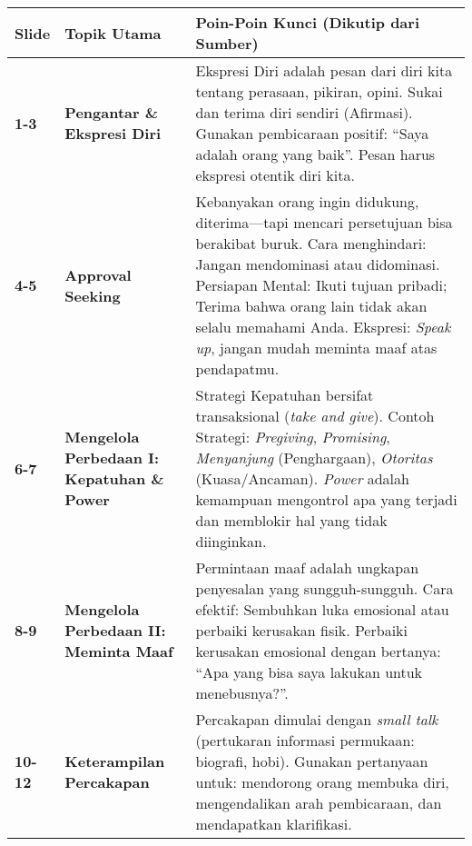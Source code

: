 \documentclass[
  letterpaper,
  DIV=11,
  numbers=noendperiod]{scrreprt}
\begin{document}
\begin{longtable}[]{@{}
  >{\raggedright\arraybackslash}p{}
  >{\raggedright\arraybackslash}p{}
  >{\raggedright\arraybackslash}p{}@{}}
\toprule\noalign{}
\begin{minipage}[b]{\linewidth}\raggedright
Slide
\end{minipage} & \begin{minipage}[b]{\linewidth}\raggedright
Topik Utama
\end{minipage} & \begin{minipage}[b]{\linewidth}\raggedright
Poin-Poin Kunci (Dikutip dari Sumber)
\end{minipage} \\
\midrule\noalign{}
\endhead
\bottomrule\noalign{}
\endlastfoot
\textbf{1-3} & \textbf{Pengantar \& Ekspresi Diri} & Ekspresi Diri
adalah pesan dari diri kita tentang perasaan, pikiran, opini. Sukai dan
terima diri sendiri (Afirmasi). Gunakan pembicaraan positif: ``Saya
adalah orang yang baik''. Pesan harus ekspresi otentik diri kita. \\
\textbf{4-5} & \textbf{Approval Seeking} & Kebanyakan orang ingin
didukung, diterima---tapi mencari persetujuan bisa berakibat buruk. Cara
menghindari: Jangan mendominasi atau didominasi. Persiapan Mental: Ikuti
tujuan pribadi; Terima bahwa orang lain tidak akan selalu memahami Anda.
Ekspresi: \emph{Speak up}, jangan mudah meminta maaf atas pendapatmu. \\
\textbf{6-7} & \textbf{Mengelola Perbedaan I: Kepatuhan \& Power} &
Strategi Kepatuhan bersifat transaksional (\emph{take and give}). Contoh
Strategi: \emph{Pregiving}, \emph{Promising}, \emph{Menyanjung}
(Penghargaan), \emph{Otoritas} (Kuasa/Ancaman). \emph{Power} adalah
kemampuan mengontrol apa yang terjadi dan memblokir hal yang tidak
diinginkan. \\
\textbf{8-9} & \textbf{Mengelola Perbedaan II: Meminta Maaf} &
Permintaan maaf adalah ungkapan penyesalan yang sungguh-sungguh. Cara
efektif: Sembuhkan luka emosional atau perbaiki kerusakan fisik.
Perbaiki kerusakan emosional dengan bertanya: ``Apa yang bisa saya
lakukan untuk menebusnya?''. \\
\textbf{10-12} & \textbf{Keterampilan Percakapan} & Percakapan dimulai
dengan \emph{small talk} (pertukaran informasi permukaan: biografi,
hobi). Gunakan pertanyaan untuk: mendorong orang membuka diri,
mengendalikan arah pembicaraan, dan mendapatkan klarifikasi.

\end{longtable}
\end{document}
